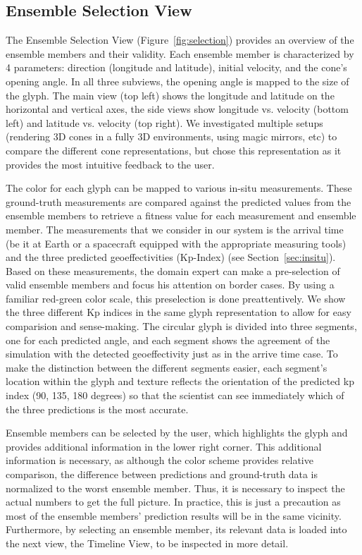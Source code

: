 \documentclass[journal]{vgtc}                %
\begin{document}
\subsection{Ensemble Selection View} \label{sec:selection}
The Ensemble Selection View (Figure~\ref{fig:selection}) provides an overview of the ensemble members and their validity. Each ensemble member is characterized by 4 parameters: direction (longitude and latitude), initial velocity, and the cone's opening angle. In all three subviews, the opening angle is mapped to the size of the glyph. The main view (top left) shows the longitude and latitude on the horizontal and vertical axes, the side views show longitude vs. velocity (bottom left) and latitude vs. velocity (top right). We investigated multiple setups (rendering 3D cones in a fully 3D environments, using magic mirrors, etc) to compare the different cone representations, but chose this representation as it provides the most intuitive feedback to the user.

The color for each glyph can be mapped to various in-situ measurements. These ground-truth measurements are compared against the predicted values from the ensemble members to retrieve a fitness value for each measurement and ensemble member. The measurements that we consider in our system is the arrival time (be it at Earth or a spacecraft equipped with the appropriate measuring tools) and the three predicted geoeffectivities (Kp-Index) (see Section~\ref{sec:insitu}). Based on these measurements, the domain expert can make a pre-selection of valid ensemble members and focus his attention on border cases. By using a familiar red-green color scale, this preselection is done preattentively. We show the three different Kp indices in the same glyph representation to allow for easy comparision and sense-making. The circular glyph is divided into three segments, one for each predicted angle, and each segment shows the agreement of the simulation with the detected geoeffectivity just as in the arrive time case. To make the distinction between the different segments easier, each segment's location within the glyph and texture reflects the orientation of the predicted kp index (90, 135, 180 degrees) so that the scientist can see immediately which of the three predictions is the most accurate.

Ensemble members can be selected by the user, which highlights the glyph and provides additional information in the lower right corner. This additional information is necessary, as although the color scheme provides relative comparison, the difference between predictions and ground-truth data is normalized to the worst ensemble member. Thus, it is necessary to inspect the actual numbers to get the full picture. In practice, this is just a precaution as most of the ensemble members' prediction results will be in the same vicinity. Furthermore, by selecting an ensemble member, its relevant data is loaded into the next view, the Timeline View, to be inspected in more detail.
\end{document}
